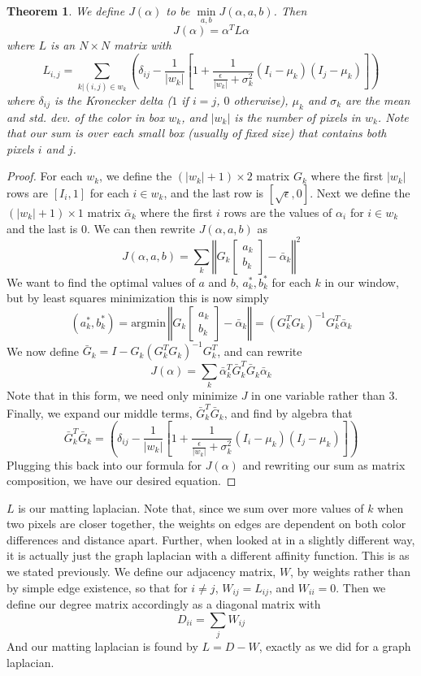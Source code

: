 \newtheorem{matlapthm}{Theorem}
\begin{matlapthm}
We define $J(\alpha)$ to be $\min\limits_{a,b} J(\alpha,a,b)$. Then
\[J(\alpha)=\alpha^{T}L\alpha\]
where $L$ is an $N\times N$ matrix with
\[L_{i,j}=\sum_{k|(i,j)\in w_k}\left(
	\delta_{ij}-\frac{1}{|w_k|}\left[
	1+\frac{1}{\frac{\epsilon}{|w_k|}+\sigma_k^2}
	(I_i-\mu_k)(I_j-\mu_k)
\right]\right)\]
where $\delta_{ij}$ is the Kronecker delta ($1$ if $i=j$, $0$ otherwise), $\mu_k$ and $\sigma_k$ are the mean and std. dev. of the color in box $w_k$, and $|w_k|$ is the number of pixels in $w_k$. Note that our sum is over each small box (usually of fixed size) that contains both pixels $i$ and $j$.
\end{matlapthm}
\begin{proof}
For each $w_k$, we define the $(|w_k|+1)\times2$ matrix $G_k$ where the first $|w_k|$ rows are $[I_i,1]$ for each $i\in w_k$, and the last row is $[\sqrt{\epsilon},0]$. Next we define the $(|w_k|+1)\times1$ matrix $\bar{\alpha}_k$ where the first $i$ rows are the values of $\alpha_i$ for $i\in w_k$ and the last is $0$. We can then rewrite $J(\alpha,a,b)$ as
\[J(\alpha,a,b)=\sum_k\left\Vert
G_k\left[\begin{array}{cc}
a_k \\ b_k
\end{array}\right]
 - \bar{\alpha}_k
\right\Vert^2\]
We want to find the optimal values of $a$ and $b$, $a_k^{*},b_k^{*}$ for each $k$ in our window, but by least squares minimization this is now simply
\[(a_k^*,b_k^*)=\text{argmin}\,
\left\Vert
G_k\left[\begin{array}{cc}
a_k \\ b_k
\end{array}\right]
 - \bar{\alpha}_k
\right\Vert=(G_k^{T}G_k)^{-1}G_k^{T}\bar{\alpha}_k\]
We now define $\bar{G}_k=I-G_k(G_k^TG_k)^{-1}G_k^T$, and can rewrite
\[J(\alpha)=
	\sum_k\bar{\alpha}_k^T\bar{G}_k^T
	      \bar{G}_k\bar{\alpha}_k\]
Note that in this form, we need only minimize $J$ in one variable rather than $3$. Finally, we expand our middle terms, $\bar{G}_k^T \bar{G}_k$, and find by algebra that
\[\bar{G}_k^T \bar{G}_k=\left(
	\delta_{ij}-\frac{1}{|w_k|}\left[
	1+\frac{1}{\frac{\epsilon}{|w_k|}+\sigma_k^2}
	(I_i-\mu_k)(I_j-\mu_k)
\right]\right)\]
Plugging this back into our formula for $J(\alpha)$ and rewriting our sum as matrix composition, we have our desired equation.
\end{proof}
$L$ is our matting laplacian. Note that, since we sum over more values of $k$ when two pixels are closer together, the weights on edges are dependent on both color differences and distance apart. Further, when looked at in a slightly different way, it is actually just the graph laplacian with a different affinity function. This is as we stated previously. We define our adjacency matrix, $W$, by weights rather than by simple edge existence, so that for $i\neq j$, $W_{ij}=L_{ij}$, and $W_{ii}=0$. Then we define our degree matrix accordingly as a diagonal matrix with
\[D_{ii}=\sum_j W_{ij}\]
And our matting laplacian is found by $L=D-W$, exactly as we did for a graph laplacian.